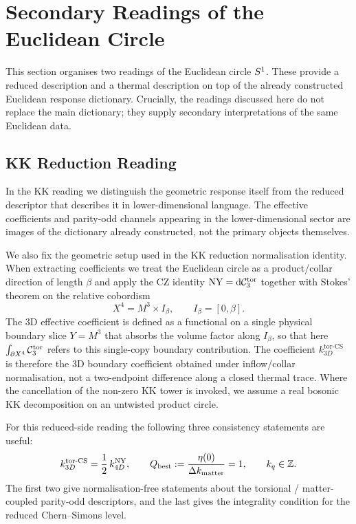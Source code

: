 \section{Secondary Readings of the Euclidean Circle}
\label{sec:circle}

This section organises two readings of the Euclidean circle $S^1$.  These
provide a reduced description and a thermal description on top of the
already constructed Euclidean response dictionary.  Crucially, the readings
discussed here do not replace the main dictionary; they supply secondary
interpretations of the same Euclidean data.

\subsection{KK Reduction Reading}
\label{sec:circle:kk}

In the KK reading we distinguish the geometric response itself from the
reduced descriptor that describes it in lower-dimensional language.  The
effective coefficients and parity-odd channels appearing in the
lower-dimensional sector are images of the dictionary already constructed,
not the primary objects themselves.

We also fix the geometric setup used in the KK reduction normalisation
identity.  When extracting coefficients we treat the Euclidean circle as a
product/collar direction of length $\beta$ and apply the CZ identity
$\mathrm{NY} = \mathrm{d}\mathcal{C}_3^{\mathrm{tor}}$ together with Stokes' theorem on the relative
cobordism
\begin{equation}
  X^4 = M^3 \times I_\beta, \qquad I_\beta = [0, \beta].
\end{equation}
The 3D effective coefficient is defined as a functional on a single physical
boundary slice $Y = M^3$ that absorbs the volume factor along $I_\beta$, so
that here $\int_{\partial X^4}\mathcal{C}_3^{\mathrm{tor}}$ refers to this single-copy boundary
contribution.  The coefficient $k_{3D}^{\mathrm{tor\text{-}CS}}$ is therefore
the 3D boundary coefficient obtained under inflow/collar normalisation, not
a two-endpoint difference along a closed thermal trace.  Where the
cancellation of the non-zero KK tower is invoked, we assume a real bosonic
KK decomposition on an untwisted product circle.

For this reduced-side reading the following three consistency statements are
useful:
\begin{equation}
  k_{3D}^{\mathrm{tor\text{-}CS}} = \frac{1}{2}\,k_{4D}^{\mathrm{NY}},
  \qquad
  Q_{\mathrm{best}} := \frac{\eta(0)}{\Delta k_{\mathrm{matter}}} = 1,
  \qquad
  k_q \in \mathbb{Z}.
\end{equation}
The first two give normalisation-free statements about the
torsional / matter-coupled parity-odd descriptors, and the last gives the
integrality condition for the reduced Chern--Simons level.

